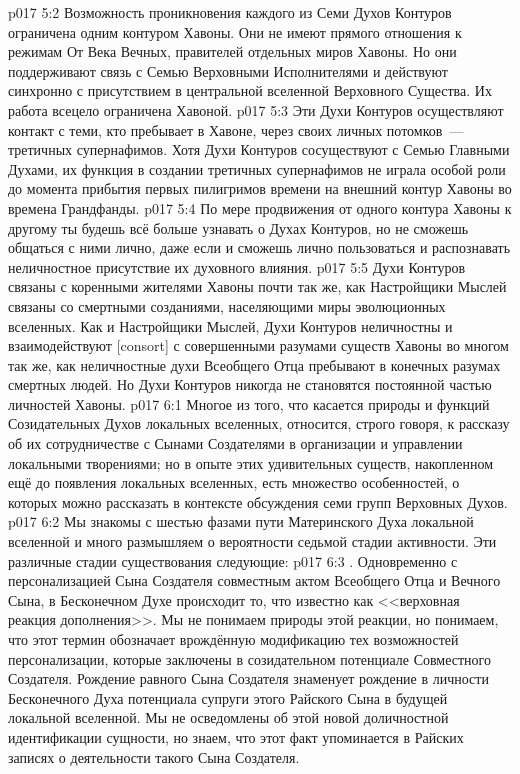\vs p017 5:2 Возможность проникновения каждого из Семи Духов Контуров ограничена одним контуром Хавоны. Они не имеют прямого отношения к режимам От Века Вечных, правителей отдельных миров Хавоны. Но они поддерживают связь с Семью Верховными Исполнителями и действуют синхронно с присутствием в центральной вселенной Верховного Существа. Их работа всецело ограничена Хавоной.
\vs p017 5:3 Эти Духи Контуров осуществляют контакт с теми, кто пребывает в Хавоне, через своих личных потомков~--- третичных супернафимов. Хотя Духи Контуров сосуществуют с Семью Главными Духами, их функция в создании третичных супернафимов не играла особой роли до момента прибытия первых пилигримов времени на внешний контур Хавоны во времена Грандфанды.
\vs p017 5:4 По мере продвижения от одного контура Хавоны к другому ты будешь всё больше узнавать о Духах Контуров, но не сможешь общаться с ними лично, даже если и сможешь лично пользоваться и распознавать неличностное присутствие их духовного влияния.
\vs p017 5:5 Духи Контуров связаны с коренными жителями Хавоны почти так же, как Настройщики Мыслей связаны со смертными созданиями, населяющими миры эволюционных вселенных. Как и Настройщики Мыслей, Духи Контуров неличностны и взаимодействуют [consort] с совершенными разумами существ Хавоны во многом так же, как неличностные духи Всеобщего Отца пребывают в конечных разумах смертных людей. Но Духи Контуров никогда не становятся постоянной частью личностей Хавоны.
\vs p017 6:1 Многое из того, что касается природы и функций Созидательных Духов локальных вселенных, относится, строго говоря, к рассказу об их сотрудничестве с Сынами Создателями в организации и управлении локальными творениями; но в опыте этих удивительных существ, накопленном ещё до появления локальных вселенных, есть множество особенностей, о которых можно рассказать в контексте обсуждения семи групп Верховных Духов.
\vs p017 6:2 \pc Мы знакомы с шестью фазами пути Материнского Духа локальной вселенной и много размышляем о вероятности седьмой стадии активности. Эти различные стадии существования следующие:
\vs p017 6:3 . Одновременно с персонализацией Сына Создателя совместным актом Всеобщего Отца и Вечного Сына, в Бесконечном Духе происходит то, что известно как <<верховная реакция дополнения>>. Мы не понимаем природы этой реакции, но понимаем, что этот термин обозначает врождённую модификацию тех возможностей персонализации, которые заключены в созидательном потенциале Совместного Создателя. Рождение равного Сына Создателя знаменует рождение в личности Бесконечного Духа потенциала супруги этого Райского Сына в будущей локальной вселенной. Мы не осведомлены об этой новой доличностной идентификации сущности, но знаем, что этот факт упоминается в Райских записях о деятельности такого Сына Создателя.
